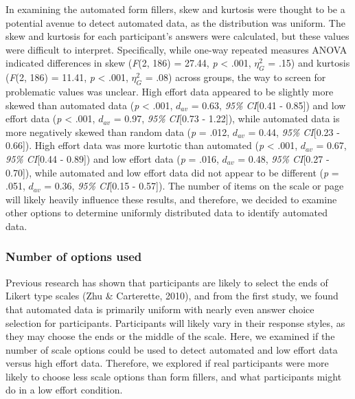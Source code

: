 \documentclass[english,man]{apa6}
\theoremstyle{definition}
\theoremstyle{definition}
\theoremstyle{definition}
\theoremstyle{remark}
\begin{document}
In examining the automated form fillers, skew and kurtosis were thought
to be a potential avenue to detect automated data, as the distribution
was uniform. The skew and kurtosis for each participant's answers were
calculated, but these values were difficult to interpret. Specifically,
while one-way repeated measures ANOVA indicated differences in skew
(\emph{F}(2, 186) = 27.44, \emph{p} \textless{} .001, \(\eta_G^2\) =
.15) and kurtosis (\emph{F}(2, 186) = 11.41, \emph{p} \textless{} .001,
\(\eta_G^2\) = .08) across groups, the way to screen for problematic
values was unclear. High effort data appeared to be slightly more skewed
than automated data (\emph{p} \textless{} .001, \(d_{av}\) = 0.63,
\emph{95\% CI}{[}0.41 - 0.85{]}) and low effort data (\emph{p}
\textless{} .001, \(d_{av}\) = 0.97, \emph{95\% CI}{[}0.73 - 1.22{]}),
while automated data is more negatively skewed than random data
(\emph{p} = .012, \(d_{av}\) = 0.44, \emph{95\% CI}{[}0.23 - 0.66{]}).
High effort data was more kurtotic than automated (\emph{p} \textless{}
.001, \(d_{av}\) = 0.67, \emph{95\% CI}{[}0.44 - 0.89{]}) and low effort
data (\emph{p} = .016, \(d_{av}\) = 0.48, \emph{95\% CI}{[}0.27 -
0.70{]}), while automated and low effort data did not appear to be
different (\emph{p} = .051, \(d_{av}\) = 0.36, \emph{95\% CI}{[}0.15 -
0.57{]}). The number of items on the scale or page will likely heavily
influence these results, and therefore, we decided to examine other
options to determine uniformly distributed data to identify automated
data.

\subsubsection{Number of options used}\label{number-of-options-used}

Previous research has shown that participants are likely to select the
ends of Likert type scales (Zhu \& Carterette, 2010), and from the first
study, we found that automated data is primarily uniform with nearly
even answer choice selection for participants. Participants will likely
vary in their response styles, as they may choose the ends or the middle
of the scale. Here, we examined if the number of scale options could be
used to detect automated and low effort data versus high effort data.
Therefore, we explored if real participants were more likely to choose
less scale options than form fillers, and what participants might do in
a low effort condition.
\end{document}
